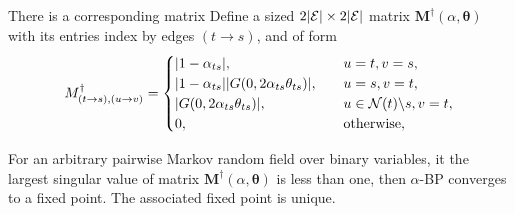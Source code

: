\documentclass[conference,onecolumn]{IEEEtran}
\begin{document}
There is a corresponding matrix
Define a sized $2| \mathcal{E} | \times 2| \mathcal{E} |$ matrix $\bm{M}^{\dagger}(\alpha, \bm{\theta})$ with its entries index by edges $(t\rightarrow s)$, and of form
\begin{equation}
  M^{\dagger}_{(t\rightarrow s), (u \rightarrow v)} =
  \begin{cases}
    |  1 - \alpha_{ts} |, &\quad u=t, v=s, \\
    |  1 - \alpha_{ts} | | G(0, 2 \alpha_{ts} \theta_{ts}) |, & \quad u = s, v =t, \\
    | G(0, 2 \alpha_{ts} \theta_{ts}) |, & \quad u \in \mathcal{N}(t)\backslash s, v = t, \\
    0, & \quad \mathrm{otherwise},
  \end{cases}
\end{equation}


\begin{cor}\label{cor:local-alpha-bp}
  For an arbitrary pairwise Markov random field over binary variables,
  it the largest singular value of matrix $\bm{M}^{\dagger}(\alpha, \bm{\theta})$ is less than one,
  then $\alpha$-BP converges to a fixed point. The associated fixed
  point is unique.
\end{cor}






% 



% 
\end{document}
